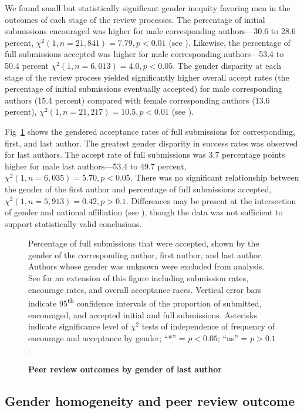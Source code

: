 \documentclass[10pt,letterpaper]{article}
\begin{document}
We found small but statistically significant gender inequity favoring men in the outcomes of each stage of the review processes. The percentage of initial submissions encouraged was higher for male corresponding authors—30.6 to 28.6 percent, $\chi^{2} (1, n = 21,841) = 7.79, p < 0.01$ (see ). Likewise, the percentage of full submissions accepted was higher for male corresponding authors—53.4 to 50.4 percent $\chi^{2} (1, n = 6,013) = 4.0, p < 0.05$. The gender disparity at each stage of the review process yielded significantly higher overall accept rates (the percentage of initial submissions eventually accepted) for male corresponding authors (15.4 percent) compared with female corresponding authors (13.6 percent), $\chi^{2} (1, n = 21,217) = 10.5, p < 0.01$ (see ).

Fig~\ref{fig4} shows the gendered acceptance rates of full submissions for corresponding, first, and last author. The greatest gender disparity in success rates was observed for last authors. The accept rate of full submissions was 3.7 percentage points higher for male last authors—53.4 to 49.7 percent, $\chi^{2} (1, n = 6,035) = 5.70, p < 0.05$. There was no significant relationship between the gender of the first author and percentage of full submissions accepted, $\chi^{2} (1, n = 5,913) = 0.42, p > 0.1$. Differences may be present at the intersection of gender and national affiliation (see ), though the data was not sufficient to support statistically valid conclusions. 

\begin{figure}[!h]
\caption{\bf Peer review outcomes by gender of last author}
Percentage of full submissions that were accepted, shown by the gender of the corresponding author, first author, and last author. Authors whose gender was unknown were excluded from analysis. See  for an extension of this figure including submission rates, encourage rates, and overall acceptance races. Vertical error bars indicate 95\textsuperscript{th} confidence intervals of the proportion of submitted, encouraged, and accepted initial and full submissions. Asterisks indicate significance level of $\chi^{2}$ tests of independence of frequency of encourage and acceptance by gender; “*” = $p < 0.05$; “ns” = $p > 0.1$.
\label{fig4}
\end{figure}

\subsection*{Gender homogeneity and peer review outcome}
\end{document}
